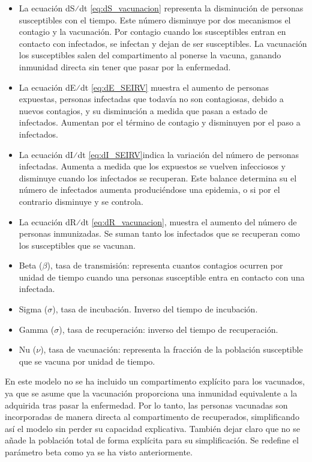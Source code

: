 \begin{itemize}
    \item 	La ecuación dS⁄dt \eqref{eq:dS_vacunacion} representa la disminución de personas susceptibles con el tiempo. Este número disminuye por dos mecanismos el contagio y la vacunación. Por contagio cuando los susceptibles entran en contacto con infectados, se infectan y dejan de ser susceptibles. La vacunación los susceptibles salen del compartimento al ponerse la vacuna, ganando inmunidad directa sin tener que pasar por la enfermedad.
    \item 	La ecuación dE⁄dt \eqref{eq:dE_SEIRV} muestra el aumento de personas expuestas, personas infectadas que todavía no son contagiosas, debido a nuevos contagios, y su disminución a medida que pasan a estado de infectados. Aumentan por el término de contagio y disminuyen por el paso a infectados.
    \item 	La ecuación dI⁄dt \eqref{eq:dI_SEIRV}indica la variación del número de personas infectadas. Aumenta a medida que los expuestos se vuelven infecciosos y disminuye cuando los infectados se recuperan. Este balance determina su el número de infectados aumenta produciéndose una epidemia, o si por el contrario disminuye y se controla.
    \item La ecuación dR⁄dt \eqref{eq:dR_vacunacion}, muestra el aumento del número de personas inmunizadas. Se suman tanto los infectados que se recuperan como los susceptibles que se vacunan.
    \item 	Beta ($\beta$), tasa de transmisión: representa cuantos contagios ocurren por unidad de tiempo cuando una personas susceptible entra en contacto con una infectada.
    \item Sigma ($\sigma$), tasa de incubación. Inverso del tiempo de incubación.
    \item Gamma ($\sigma$), tasa de recuperación: inverso del tiempo de recuperación.
    \item 	Nu ($\nu$), tasa de vacunación: representa la fracción de la población susceptible que se vacuna por unidad de tiempo.
\end{itemize}

En este modelo no se ha incluido un compartimento explícito para los vacunados, ya que se asume que la vacunación proporciona una inmunidad equivalente a la adquirida tras pasar la enfermedad. Por lo tanto, las personas vacunadas son incorporadas de manera directa al compartimento de recuperados, simplificando así el modelo sin perder su capacidad explicativa. También dejar claro que no se añade la población total de forma explícita para su simplificación. Se redefine el parámetro beta como ya se ha visto anteriormente.

